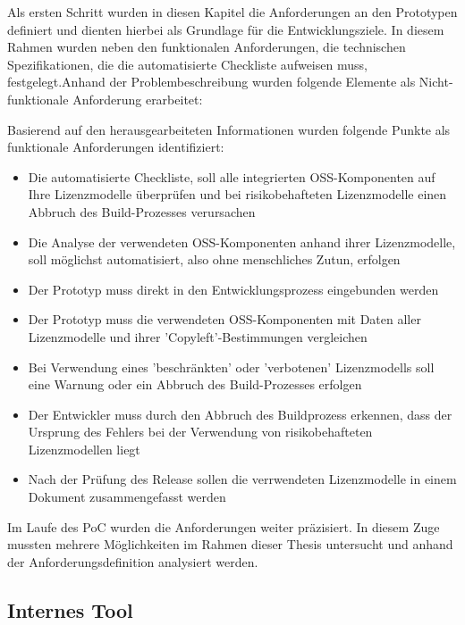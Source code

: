 Als ersten Schritt wurden in diesen Kapitel die Anforderungen an den Prototypen definiert und dienten hierbei als Grundlage für die Entwicklungsziele. In diesem Rahmen wurden neben den funktionalen Anforderungen, die technischen Spezifikationen, die die automatisierte Checkliste aufweisen muss, festgelegt.Anhand der Problembeschreibung wurden folgende Elemente als Nicht-funktionale Anforderung erarbeitet: 

Basierend auf den herausgearbeiteten Informationen wurden folgende Punkte als funktionale Anforderungen identifiziert: 

\begin{itemize}
    \item Die automatisierte Checkliste, soll alle integrierten OSS-Komponenten auf Ihre Lizenzmodelle überprüfen und bei risikobehafteten Lizenzmodelle einen Abbruch des Build-Prozesses verursachen
    \item Die Analyse der verwendeten OSS-Komponenten anhand ihrer Lizenzmodelle, soll möglichst automatisiert, also ohne menschliches Zutun, erfolgen
    \item Der Prototyp muss direkt in den Entwicklungsprozess  eingebunden werden 
    \item Der Prototyp muss die verwendeten OSS-Komponenten mit Daten aller Lizenzmodelle und ihrer 'Copyleft'-Bestimmungen vergleichen 
    \item Bei Verwendung eines 'beschränkten' oder 'verbotenen' Lizenzmodells soll eine Warnung oder ein Abbruch des Build-Prozesses erfolgen      
    \item Der Entwickler muss durch den Abbruch des Buildprozess erkennen, dass der Ursprung des Fehlers bei der Verwendung von risikobehafteten Lizenzmodellen liegt
    \item Nach der Prüfung des Release sollen die verrwendeten Lizenzmodelle in einem Dokument zusammengefasst werden
\end{itemize}

Im Laufe des PoC wurden die Anforderungen weiter präzisiert. In diesem Zuge mussten mehrere Möglichkeiten im Rahmen dieser Thesis untersucht und anhand der Anforderungsdefinition analysiert werden.

\subsection{Internes Tool}

